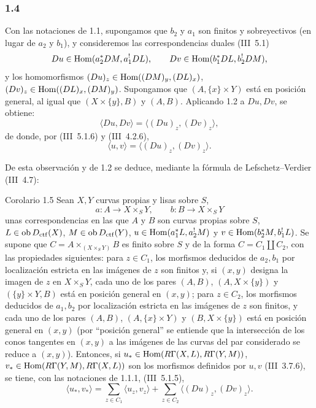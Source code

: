 \subsubsection*{1.4}
Con las notaciones de 1.1, supongamos que $b_2$ y $a_1$ son finitos y sobreyectivos (en lugar de $a_2$ y $b_1$), y consideremos las correspondencias duales (III~5.1)
\[
Du\in\operatorname{Hom}(a_2^*DM,a_1^!DL),\qquad Dv\in\operatorname{Hom}(b_1^*DL,b_2^!DM),
\]
y los homomorfismos $(Du)_z\in\operatorname{Hom}((DM)_y,(DL)_x)$, $(Dv)_z\in\operatorname{Hom}((DL)_x,(DM)_y)$. Supongamos que $(A,\{x\}\times Y)$ está en posición general, al igual que $(X\times\{y\},B)$ y $(A,B)$. Aplicando 1.2 a $Du,Dv$, se obtiene:
\[
\langle Du,Dv\rangle=\langle (Du)_z,(Dv)_z\rangle,
\]
de donde, por (III~5.1.6) y (III~4.2.6),
\begin{equation}\tag{1.4.1}
\langle u,v\rangle=\langle (Du)_z,(Dv)_z\rangle.
\end{equation}

De esta observación y de 1.2 se deduce, mediante la fórmula de Lefschetz--Verdier (III~4.7):

\begin{statement}{Corolario 1.5}
Sean $X,Y$ curvas propias y lisas sobre $S$,
\[
a:A\longrightarrow X\times_S Y,
\qquad
b:B\longrightarrow X\times_S Y
\]
unas correspondencias en las que $A$ y $B$ son curvas propias sobre $S$, $L\in\operatorname{ob} D_{\mathrm{ctf}}(X)$, $M\in\operatorname{ob} D_{\mathrm{ctf}}(Y)$, $u\in\operatorname{Hom}(a_1^*L,a_2^!M)$ y $v\in\operatorname{Hom}(b_2^*M,b_1^!L)$. Se supone que $C=A\times_{(X\times_S Y)}B$ es finito sobre $S$ y de la forma $C=C_1\amalg C_2$, con las propiedades siguientes: para $z\in C_1$, los morfismos deducidos de $a_2,b_1$ por localización estricta en las imágenes de $z$ son finitos y, si $(x,y)$ designa la imagen de $z$ en $X\times_S Y$, cada uno de los pares $(A,B)$, $(A,X\times\{y\})$ y $(\{y\}\times Y,B)$ está en posición general en $(x,y)$; para $z\in C_2$, los morfismos deducidos de $a_1,b_2$ por localización estricta en las imágenes de $z$ son finitos, y cada uno de los pares $(A,B)$, $(A,\{x\}\times Y)$ y $(B,X\times\{y\})$ está en posición general en $(x,y)$ (por ``posición general'' se entiende que la intersección de los conos tangentes en $(x,y)$ a las imágenes de las curvas del par considerado se reduce a $(x,y)$). Entonces, si $u_*\in\operatorname{Hom}(R\Gamma(X,L),R\Gamma(Y,M))$, $v_*\in\operatorname{Hom}(R\Gamma(Y,M),R\Gamma(X,L))$ son los morfismos definidos por $u,v$ (III~3.7.6), se tiene, con las notaciones de 1.1.1, (III~5.1.5),
\begin{equation}\tag{1.5.1}
\langle u_*,v_*\rangle=\sum_{z\in C_1}\langle u_z,v_z\rangle+\sum_{z\in C_2}\langle (Du)_z,(Dv)_z\rangle.
\end{equation}
\end{statement}

